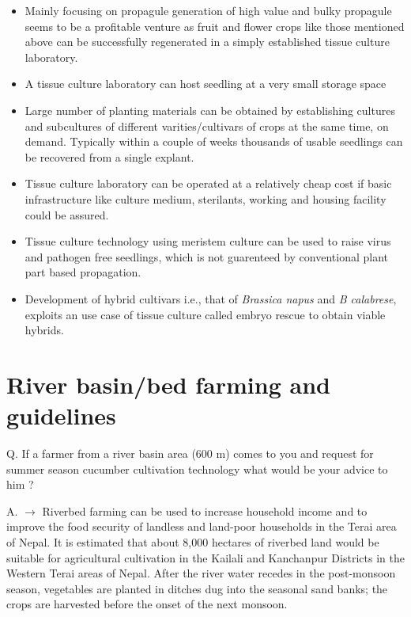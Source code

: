 \documentclass[
]{book}
\providecommand{\tightlist}{%
  \setlength{\itemsep}{0pt}\setlength{\parskip}{0pt}}
\begin{document}
\begin{itemize}
\tightlist
\item
  Mainly focusing on propagule generation of high value and bulky propagule seems to be a profitable venture as fruit and flower crops like those mentioned above can be successfully regenerated in a simply established tissue culture laboratory.
\item
  A tissue culture laboratory can host seedling at a very small storage space
\item
  Large number of planting materials can be obtained by establishing cultures and subcultures of different varities/cultivars of crops at the same time, on demand. Typically within a couple of weeks thousands of usable seedlings can be recovered from a single explant.
\item
  Tissue culture laboratory can be operated at a relatively cheap cost if basic infrastructure like culture medium, sterilants, working and housing facility could be assured.
\item
  Tissue culture technology using meristem culture can be used to raise virus and pathogen free seedlings, which is not guarenteed by conventional plant part based propagation.
\item
  Development of hybrid cultivars i.e., that of \emph{Brassica napus} and \emph{B calabrese}, exploits an use case of tissue culture called embryo rescue to obtain viable hybrids.
\end{itemize}

\hypertarget{river-basinbed-farming-and-guidelines}{%
\section{River basin/bed farming and guidelines}\label{river-basinbed-farming-and-guidelines}}

Q. If a farmer from a river basin area (600 m) comes to you and request for summer season cucumber cultivation technology what would be your advice to him ?

A. \(\longrightarrow\) Riverbed farming can be used to increase household income and to improve the food security of landless and land-poor households in the Terai area of Nepal. It is estimated that about 8,000 hectares of riverbed land would be suitable for agricultural cultivation in the Kailali and Kanchanpur Districts in the Western Terai areas of Nepal. After the river water recedes in the post-monsoon season, vegetables are planted in ditches dug into the seasonal sand banks; the crops are harvested before the onset of the next monsoon.
\end{document}
